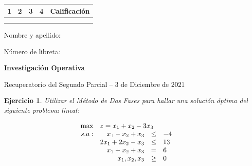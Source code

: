 \documentclass[a4paper,oneside,12pt]{amsart}
\newcommand{\nombremateria}
{Investigaci\'on Operativa}
\newcommand{\numeroparcial}
    { Recuperatorio del Segundo Parcial }
\newcommand{\fecha}
    {3 de Diciembre de 2021}
\newtheorem{quest}{Ejercicio}
\begin{document}
\hfill \hfill
\begin{tabular}[c]{|c|c|c|c|c|}
\hline 
1 & 2 & 3 & 4 & Calificaci\'on \\ \hline \hline
\hspace{1 cm} & \hspace{1 cm} & \hspace{1 cm} & \hspace{1 cm} & \hspace{1.3 cm} \\
\hspace{1 cm} & \hspace{1  cm} & \hspace{1  cm} & \hspace{1  cm} & \hspace{1.3 cm} \\ \hline

\end{tabular}

\vspace{-1cm}

\noindent Nombre y apellido:

\vspace{0.2cm}

\noindent Número de libreta:

\noindent \hrulefill 

\smallskip
\renewcommand{\baselinestretch}{1.1}

\begin{center}
	\large \textbf{\nombremateria} 
	
	\numeroparcial -- \fecha
\end{center}

\renewcommand{\theenumi}{\textbf{\arabic{enumi}}}


\begin{quest} 
Utilizar el Método de Dos Fases para hallar una solución óptima del siguiente problema lineal:

\[
\begin{array}{rrcl}
\max & \multicolumn{3}{l}{z = x_1+x_2-3x_3} \\
s.a: & x_1-x_2+x_3 & \leq & -4 \\
 & 2x_1+2x_2-x_3 & \leq & 13 \\
 & x_1+x_2+x_3 & = & 6 \\
 & x_1,x_2,x_3 & \geq & 0
\end{array}
\]
\end{quest}
\end{document}
